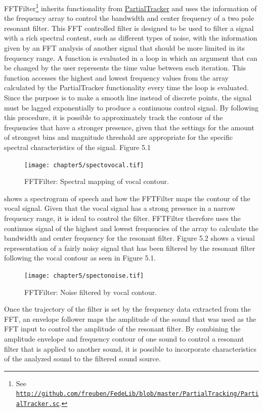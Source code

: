 FFTFilter\footnote{See \href{http://github.com/freuben/FedeLib/blob/master/PartialTracking/PartialTracker.sc}{\texttt{http://github.com/freuben/FedeLib/blob/master/PartialTracking/PartialTracker.sc}}.} inherits functionality from \hyperlink{partrack}{PartialTracker} and uses the information of the frequency array to control the bandwidth and center frequency of a two pole resonant filter. This FFT controlled filter is designed to be used to filter a signal with a rich spectral content, such as different types of noise, with the information given by an FFT analysis of another signal that should be more limited in its frequency range. A function is evaluated in a loop in which an argument that can be changed by the user represents the time value between each iteration. This function accesses the highest and lowest frequency values from the array calculated by the PartialTracker functionality every time the loop is evaluated. Since the purpose is to make a smooth line instead of discrete points, the signal must be lagged exponentially to produce a continuous control signal. By following this procedure, it is possible to approximately track the contour of the frequencies that have a stronger presence, given that the settings for the amount of strongest bins and magnitude threshold are appropriate for the specific spectral characteristics of the signal. Figure 5.1 
\begin{figure}[htbp] %
   \centering
   \texttt{[image: chapter5/spectovocal.tif]} %
   \caption{FFTFilter: Spectral mapping of vocal contour.}
   \label{fig:example}
\end{figure}
shows a spectrogram of speech and how the FFTFilter maps the contour of the vocal signal. Given that the vocal signal has a strong presence in a narrow frequency range, it is ideal to control the filter. FFTFilter therefore uses the continuos signal of the highest and lowest frequencies of the array to calculate the bandwidth and center frequency for the resonant filter. Figure 5.2 shows a visual representation of a fairly noisy signal that has been filtered by the resonant filter following the vocal contour as seen in Figure 5.1. 
\begin{figure}[htbp] %
   \centering
   \texttt{[image: chapter5/spectonoise.tif]} %
   \caption{FFTFilter: Noise filtered by vocal contour.}
   \label{fig:example}
\end{figure}
Once the trajectory of the filter is set by the frequency data extracted from the FFT, an envelope follower maps the amplitude of the sound that was used as the FFT input to control the amplitude of the resonant filter. By combining the amplitude envelope and frequency contour of one sound to control a resonant filter that is applied to another sound, it is possible to incorporate characteristics of the analyzed sound to the filtered sound source.

